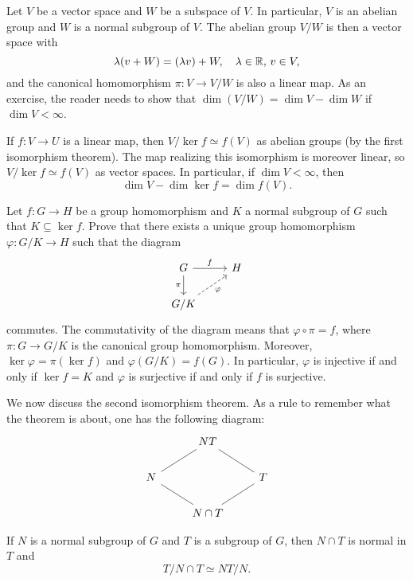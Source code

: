 \begin{example}
Let $V$ be a vector space and $W$ be a subspace of $V$. 
In particular, 
$V$ is an abelian group and 
$W$ is a normal subgroup of $V$. The abelian group 
$V/W$ is then a vector space with 
\[
\lambda(v+W)=(\lambda v)+W,\quad \lambda\in\mathbb{R},\,v\in V,
\]
and the canonical homomorphism
$\pi\colon V\to V/W$ is also a linear map. As an exercise, 
the reader needs to show that 
$\dim (V/W)=\dim V-\dim W$
if $\dim V<\infty$.

If $f\colon V\to U$ is a linear map, then
$V/\ker f\simeq f(V)$ as abelian groups (by the first
isomorphism theorem). The map realizing this
isomorphism is moreover linear, so 
$V/\ker f\simeq f(V)$ as vector spaces. In particular, 
if $\dim V<\infty$, then
\[
\dim V-\dim\ker f=\dim f(V).
\]
\end{example}

\begin{exercise}
\label{xca:quotients}
Let $f\colon G\to H$ be a group homomorphism and 
$K$ a normal subgroup of $G$ such that $K\subseteq\ker f$. 
Prove that there exists a unique group homomorphism 
$\varphi\colon G/K\to H$ such that the diagram 
\[\begin{tikzcd}
        G & H \\
        {G/K}
        \arrow["f", from=1-1, to=1-2]
        \arrow["\pi"', from=1-1, to=2-1]
        \arrow["\varphi"', dashed, from=2-1, to=1-2]
\end{tikzcd}
\]
commutes. The commutativity of the diagram means that  $\varphi\circ\pi=f$, where $\pi\colon G\to G/K$ is the canonical group
homomorphism. Moreover, 
$\ker\varphi=\pi(\ker f)$ and $\varphi(G/K)=f(G)$.
In particular, $\varphi$ is injective if and only if 
$\ker f=K$ and $\varphi$ is surjective if and only if $f$ is surjective. 
\end{exercise}

We now discuss the second isomorphism theorem. As a rule to remember
what the theorem is about, one has the following diagram:
\[\begin{tikzcd}
        & NT \\
        N && T \\
        & {N\cap T}
        \arrow[no head, from=1-2, to=2-3]
        \arrow[no head, from=1-2, to=2-1]
        \arrow[no head, from=2-1, to=3-2]
        \arrow[no head, from=2-3, to=3-2]
\end{tikzcd}\]

\begin{exercise}
If $N$ is a normal subgroup of $G$ and 
$T$ is a subgroup of $G$, then $N\cap T$ is normal in $T$
and 
\[
T/N\cap T\simeq NT/N.
\]
\end{exercise}


